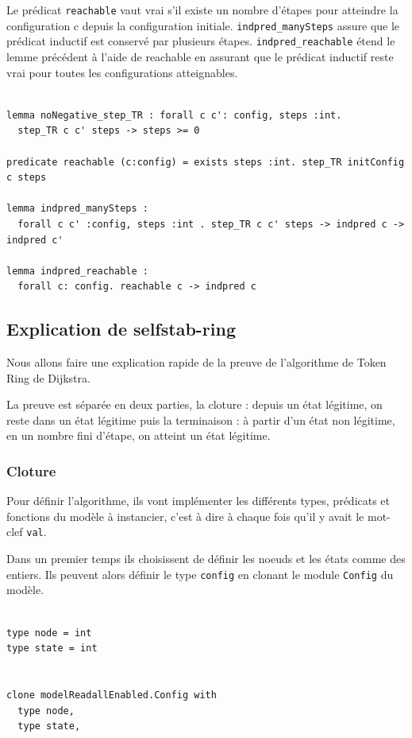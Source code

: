 \documentclass[11pt]{article}
\begin{document}
Le prédicat \texttt{reachable} vaut vrai s'il existe un nombre d'étapes pour atteindre la configuration c depuis la configuration initiale.
\texttt{indpred\_manySteps} assure que le prédicat inductif est conservé par plusieurs étapes.
\texttt{indpred\_reachable} étend le lemme précédent à l'aide de reachable en assurant que le prédicat inductif reste vrai pour toutes les configurations atteignables. 
\lstset{language=why3,label= ,caption= ,captionpos=b,numbers=none}
\begin{lstlisting}

lemma noNegative_step_TR : forall c c': config, steps :int.
  step_TR c c' steps -> steps >= 0

predicate reachable (c:config) = exists steps :int. step_TR initConfig c steps

lemma indpred_manySteps :
  forall c c' :config, steps :int . step_TR c c' steps -> indpred c -> indpred c'

lemma indpred_reachable :
  forall c: config. reachable c -> indpred c

\end{lstlisting}


\subsection{Explication de selfstab-ring}
\label{sec:org6b923a9}
Nous allons faire une explication rapide de la preuve de l'algorithme de Token Ring de Dijkstra.

La preuve est séparée en deux parties, la cloture : depuis un état légitime, on reste dans un état légitime 
puis la terminaison : à partir d'un état non légitime, en un nombre fini d'étape, on atteint un état légitime.

\subsubsection{Cloture}
\label{sec:org3d8eb84}
Pour définir l'algorithme, ils vont implémenter les différents types, prédicats et fonctions du modèle à instancier, c'est à dire à chaque fois
qu'il y avait le mot-clef \texttt{val}.


Dans un premier temps ils choisissent de définir les noeuds et les états comme des entiers. 
Ils peuvent alors définir le type \texttt{config} en clonant le module \texttt{Config} du modèle. 


\lstset{language=why3,label= ,caption= ,captionpos=b,numbers=none}
\begin{lstlisting}

type node = int
type state = int


clone modelReadallEnabled.Config with
  type node,
  type state,

\end{lstlisting}
\end{document}
